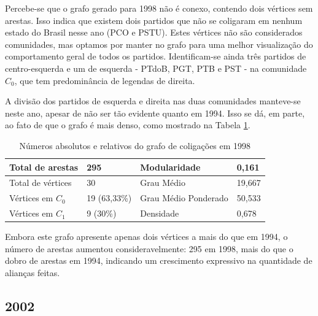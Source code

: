 Percebe-se que o grafo gerado para 1998 não é conexo, contendo dois vértices sem arestas. Isso indica que existem dois partidos que não se coligaram em nenhum estado do Brasil nesse ano (\gls{PCO} e \gls{PSTU}). Estes vértices não são considerados comunidades, mas optamos por manter no grafo para uma melhor visualização do comportamento geral de todos os partidos. Identificam-se ainda três partidos de centro-esquerda e um de esquerda - \gls{PTdoB}, \gls{PGT}, \gls{PTB} e \gls{PST} - na comunidade $C_0$, que tem predominância de legendas de direita.

A divisão dos partidos de esquerda e direita nas duas comunidades manteve-se neste ano, apesar de não ser tão evidente quanto em 1994. Isso se dá, em parte, ao fato de que o grafo é mais denso, como mostrado na Tabela \ref{table-1998}. 



\begin{table}[H]
\centering
\label{table-1998}
\begin{tabular}{|l|l|l|l|}
\hline
Total de arestas  & 295 & Modularidade         & 0,161 \\ \hline
Total de vértices & 30  & Grau Médio           & 19,667 \\ \hline
Vértices em $C_0$    & 19  (63,33\%) & Grau Médio Ponderado & 50,533 \\ \hline
Vértices em $C_1$    & 9 (30\%) & Densidade            &  0,678\\ \hline
\end{tabular}
\caption{Números absolutos e relativos do grafo de coligações em 1998}
\end{table}

Embora este grafo apresente apenas dois vértices a mais do que em 1994, o número de arestas aumentou consideravelmente: 295 em 1998, mais do que o dobro de arestas em 1994, indicando um crescimento expressivo na quantidade de alianças feitas.


\subsection{2002}
\label{resultados__grafos--2002}

